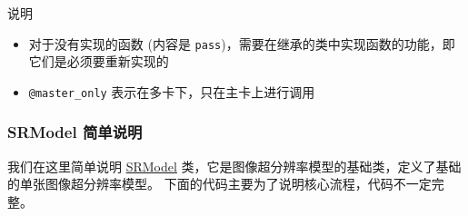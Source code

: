 \documentclass[../main.tex]{subfiles}
\begin{document}
\begin{exampleBox}[righthand ratio=0.00, sidebyside, sidebyside align=center, lower separated=false]{说明}
    \begin{itemize}
        \item 对于没有实现的函数 (内容是 \texttt{pass})，需要在继承的类中实现函数的功能，即它们是必须要重新实现的
        \item \texttt{@master\_only} 表示在多卡下，只在主卡上进行调用
    \end{itemize}
\end{exampleBox}

\subsubsection{SRModel 简单说明}\label{code_structure:sr_model}

我们在这里简单说明 \href{https://github.com/XPixelGroup/BasicSR/blob/master/basicsr/models/sr_model.py}{SRModel} 类，它是图像超分辨率模型的基础类，定义了基础的单张图像超分辨率模型。
下面的代码主要为了说明核心流程，代码不一定完整。
\end{document}
